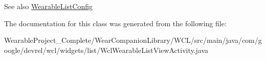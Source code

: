 \begin{DoxySeeAlso}{See also}
\hyperlink{classcom_1_1google_1_1devrel_1_1wcl_1_1widgets_1_1list_1_1WearableListConfig}{Wearable\+List\+Config} 
\end{DoxySeeAlso}


The documentation for this class was generated from the following file\+:\begin{DoxyCompactItemize}
\item 
Wearable\+Project\+\_\+\+Complete/\+Wear\+Companion\+Library/\+W\+C\+L/src/main/java/com/google/devrel/wcl/widgets/list/Wcl\+Wearable\+List\+View\+Activity.\+java\end{DoxyCompactItemize}
